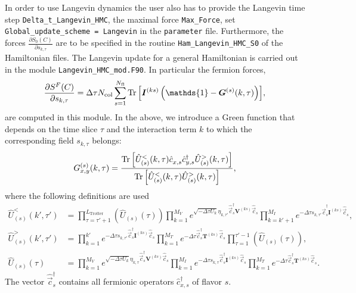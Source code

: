 In order to use Langevin dynamics the user also has to provide the Langevin time step \texttt{Delta\_t\_Langevin\_HMC},  the maximal force \texttt{Max\_Force},  set  \texttt{Global\_update\_scheme = Langevin} in the \texttt{parameter} file.  Furthermore, the   forces   $ \frac{ \partial S_{0}(C)}{\partial s_{k,\tau}}  $  are to be specified in the routine \texttt{Ham\_Langevin\_HMC\_S0}  of the Hamiltonian files.  The Langevin update   for a general Hamiltonian  is carried out in the module  \texttt{Langevin\_HMC\_mod.F90}.   In particular the  fermion forces, 
\begin{equation}
 \frac { \partial S^F(C)}{\partial s_{k,\tau} } 
 	=  \Delta \tau {N_{\mathrm{col}}} \sum\limits_{s=1}^{N_{\mathrm{fl}}} \Tr{\left[ \bm{I}^{(ks)} \left(\mathds{1} - \bm{G}^{(s)}(k,\tau) \right) \right]},
\end{equation}
are computed in this module. 
In the above, we  introduce a Green function that depends on the time slice $\tau$  and the interaction term $k$ to which the corresponding field $s_{k,\tau}$ belongs:
\begin{equation}\label{eqn:green_langevin}
G_{x,y}^{(s)}(k,\tau) = \frac{\Tr{\left[ \hat{U}_{(s)}^{<}(k,\tau) \hat{c}_{x,s}^{\phantom\dagger} \hat{c}_{y,s}^{\dagger} \hat{U}_{(s)}^{>}(k,\tau) \right]} }
{\Tr{\left[ \hat{U}_{(s)}^{<}(k,\tau)\hat{U}_{(s)}^{>}(k,\tau) \right]}},
\end{equation}
where the following definitions are used
\begin{align}
 \hat{U}_{(s)}^{<}(k',\tau') &= \prod_{\tau=\tau'+1}^{L_{\text{Trotter}}}  \left( \hat{U}_{(s)}(\tau) \right)
  \prod_{k=1}^{M_V} e^{\sqrt{-\Delta\tau U_k}  \eta_{k,\tau'} \hat{\vec{c}}_{s}^{\dagger} \bm{V}^{(ks)} \hat{\vec{c}}_{s}^{\phantom\dagger}}
\prod_{k=k'+1}^{M_I} e^{-\Delta\tau s_{k,\tau'} \hat{\vec{c}}_{s}^{\dagger} \bm{I}^{(ks)} \hat{\vec{c}}_{s}^{\phantom\dagger}}, \\
 \hat{U}_{(s)}^{>}(k',\tau') &= \prod_{k=1}^{k'} e^{-\Delta \tau s_{k,\tau'}  \hat{\vec{c}}_{s}^{\dagger} \bm{I}^{(ks)} \hat{\vec{c}}_{s}^{\phantom\dagger}}
  \prod_{k=1}^{M_T}   e^{-\Delta\tau  \hat{\vec{c}}_{s}^{\dagger} \bm{T}^{(ks)} \hat{\vec{c}}_{s}^{\phantom\dagger}} 
  \prod_{\tau=1}^{\tau'-1}  \left( \hat{U}_{(s)}(\tau) \right), \\
  \hat{U}_{(s)}(\tau) &= \prod_{k=1}^{M_V} e^{\sqrt{-\Delta\tau U_k}  \eta_{k,\tau} \hat{\vec{c}}_{s}^{\dagger} \bm{V}^{(ks)} \hat{\vec{c}}_{s}^{\phantom\dagger}} 
  \prod_{k=1}^{M_I} e^{-\Delta\tau s_{k,\tau} \hat{\vec{c}}_{s}^{\dagger} \bm{I}^{(ks)} \hat{\vec{c}}_{s}^{\phantom\dagger}}
    \prod_{k=1}^{M_T}   e^{-\Delta\tau  \hat{\vec{c}}_{s}^{\dagger} \bm{T}^{(ks)} \hat{\vec{c}}_{s}^{\phantom\dagger}} .
\end{align}
The vector $\hat{\vec{c}}_s^{\dagger}$ contains all fermionic operators $\hat{c}_{x,s}^{\dagger}$ of flavor $s$.


